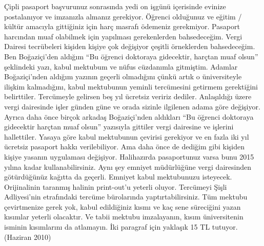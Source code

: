 \documentclass[12pt]{article}
\theoremstyle{break}
\begin{document}
Çipli pasaport başvurunuz sonrasında yedi on işgünü içerisinde evinize postalanıyor ve imzanızla almanız gerekiyor. Öğrenci olduğunuz ve eğitim / kültür amacıyla gittiğiniz için harç masrafı ödemeniz gerekmiyor. Pasaport harcından muaf olabilmek için yapılması gerekenlerden bahsedeceğim. Vergi Dairesi tecrübeleri kişiden kişiye çok değişiyor çeşitli örneklerden bahsedeceğim. Ben Boğaziçi’den aldığım “Bu öğrenci doktoraya gidecektir, harçtan muaf olsun” şeklindeki yazı, kabul mektubum ve nüfus cüzdanımla gitmiştim. Adamlar Boğaziçi’nden aldığım yazının geçerli olmadığını çünkü artık o üniversiteyle ilişkim kalmadığını, kabul mektubunun yeminli tercümesini getirmem gerektiğini belirttiler. Tercümeyle gelirsen beş yıl ücretsiz veririz dediler. Anlaşıldığı üzere vergi dairesinde işler günden güne ve orada sizinle ilgilenen adama göre değişiyor. Ayrıca daha önce birçok arkadaş Boğaziçi’nden aldıkları “Bu öğrenci doktoraya gidecektir harçtan muaf olsun” yazısıyla gittiler vergi dairesine ve işlerini hallettiler. Yasaya göre kabul mektubunun çevirisi gerekiyor ve en fazla iki yıl ücretsiz pasaport hakkı verilebiliyor. Ama daha önce de dediğim gibi kişiden kişiye yasanın uygulaması değişiyor. Halihazırda pasaportunuz varsa bunu 2015 yılına kadar kullanabilirsiniz. Aynı şey emniyet müdürlüğüne vergi dairesinden götürdüğünüz kağıtta da geçerli. Emniyet kabul mektubunuzu isteyecek. Orijinalinin taranmış halinin print-out’u yeterli oluyor. Tercümeyi Şişli Adliyesi’nin etrafındaki tercüme bürolarında yaptırtabilirsiniz. Tüm mektubu çevirtmenize gerek yok, kabul edildiğiniz kısmı ve kaç sene süreciğini yazan kısımlar yeterli olacaktır. Ve tabii mektubu imzalayanın, kısım üniversitenin isminin kısımlarını da atlamayın. İki paragraf için yaklaşık 15 TL tutuyor. (Haziran 2010)
\end{document}
